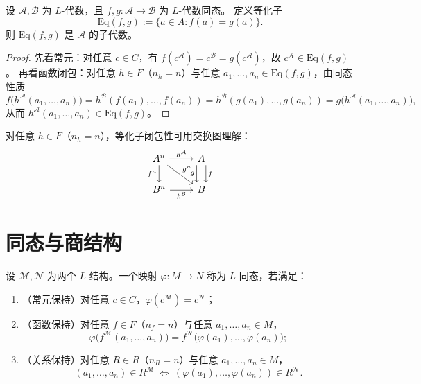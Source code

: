 \documentclass[lang=cn,a4paper,newtx,section]{elegantbook}
\begin{document}
 \begin{lemma}[等化子为子代数]
 设 $\mathcal A,\mathcal B$ 为 $L$-代数，且 $f,g:\mathcal A\to\mathcal B$ 为 $L$-代数同态。
 定义等化子
 \[
   \mathrm{Eq}(f,g):=\{a\in A: f(a)=g(a)\}.
 \]
 则 $\mathrm{Eq}(f,g)$ 是 $\mathcal A$ 的子代数。
 \end{lemma}
 
 \begin{proof}
 先看常元：对任意 $c\in C$，有 $f(c^{\mathcal A})=c^{\mathcal B}=g(c^{\mathcal A})$，故 $c^{\mathcal A}\in\mathrm{Eq}(f,g)$。
 再看函数闭包：对任意 $h\in F$（$n_h=n$）与任意 $a_1,\dots,a_n\in\mathrm{Eq}(f,g)$，由同态性质
 \[
   f\bigl(h^{\mathcal A}(a_1,\dots,a_n)\bigr)=h^{\mathcal B}(f(a_1),\dots,f(a_n))=h^{\mathcal B}(g(a_1),\dots,g(a_n))=g\bigl(h^{\mathcal A}(a_1,\dots,a_n)\bigr),
 \]
 从而 $h^{\mathcal A}(a_1,\dots,a_n)\in\mathrm{Eq}(f,g)$。
 \end{proof}
 
 \begin{remark}
 对任意 $h\in F$（$n_h=n$），等化子闭包性可用交换图理解：
 \[
 \begin{tikzcd}
 A^{n} \arrow[r, "h^{\mathcal A}"] \arrow[d, "f^{n}"'] \arrow[dr, "g^{n}"] & A \arrow[d, shift left=1.1ex, "f"] \arrow[d, shift right=1.1ex, "g"'] \\
 B^{n} \arrow[r, "h^{\mathcal B}"'] & B
 \end{tikzcd}
 \]
 \end{remark}

\section{同态与商结构}

\begin{definition}[$L$-同态]
设 $\mathcal M,\mathcal N$ 为两个 $L$-结构。一个映射 $\varphi:M\to N$ 称为 $L$-同态，若满足：
\begin{enumerate}
  \item （常元保持）对任意 $c\in C$，$\varphi(c^{\mathcal M})=c^{\mathcal N}$；
  \item （函数保持）对任意 $f\in F$（$n_f=n$）与任意 $a_1,\dots,a_n\in M$，
  \[
    \varphi\bigl(f^{\mathcal M}(a_1,\dots,a_n)\bigr)=f^{\mathcal N}\bigl(\varphi(a_1),\dots,\varphi(a_n)\bigr);
  \]
  \item （关系保持）对任意 $R\in R$（$n_R=n$）与任意 $a_1,\dots,a_n\in M$，
  \[
    (a_1,\dots,a_n)\in R^{\mathcal M}\ \Longleftrightarrow\ (\varphi(a_1),\dots,\varphi(a_n))\in R^{\mathcal N}.
  \]
\end{enumerate}
\end{definition}
\end{document}
